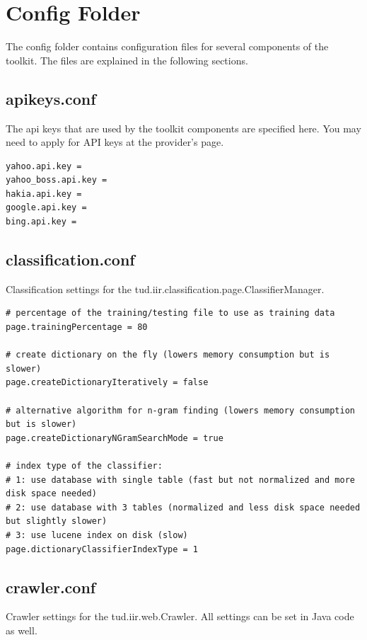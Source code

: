 \documentclass[a4paper,twoside]{book}      %
\begin{document}
\section{Config Folder}
\label{sec:config.conf}
The config folder contains configuration files for several components of the toolkit. The files are explained in the following sections.

\subsection{apikeys.conf}
\label{sec:apikeys.conf}
The api keys that are used by the toolkit components are specified here. You may need to apply for API keys at the provider's page.

\begin{verbatim}
yahoo.api.key = 
yahoo_boss.api.key = 
hakia.api.key = 
google.api.key = 
bing.api.key = 
\end{verbatim}

\subsection{classification.conf}
\label{sec:classification.conf}
Classification settings for the tud.iir.classification.page.ClassifierManager.

\begin{verbatim}
# percentage of the training/testing file to use as training data
page.trainingPercentage = 80

# create dictionary on the fly (lowers memory consumption but is slower)
page.createDictionaryIteratively = false

# alternative algorithm for n-gram finding (lowers memory consumption but is slower)
page.createDictionaryNGramSearchMode = true

# index type of the classifier:
# 1: use database with single table (fast but not normalized and more disk space needed)
# 2: use database with 3 tables (normalized and less disk space needed but slightly slower)
# 3: use lucene index on disk (slow)
page.dictionaryClassifierIndexType = 1
\end{verbatim}

\subsection{crawler.conf}
\label{sec:crawler.conf}
Crawler settings for the tud.iir.web.Crawler. All settings can be set in Java code as well.
\end{document}
